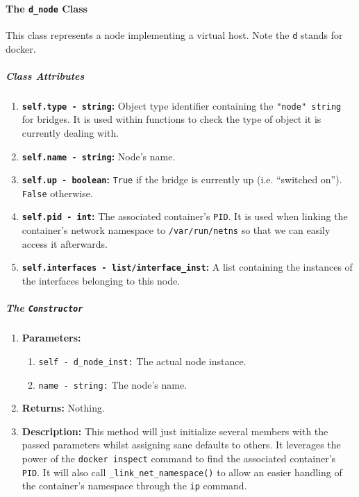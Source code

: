                 \paragraph{The \texttt{d\_node} Class}
                    This class represents a node implementing a virtual host. Note the \texttt{d} stands for docker.

                    \subparagraph{Class Attributes}
                        \begin{enumerate}
                            \item \textbf{\texttt{self.type - string}:} Object type identifier containing the \texttt{"node" string} for bridges. It is used within functions to check the type of object it is currently dealing with.
                            \item \textbf{\texttt{self.name - string}:} Node's name.
                            \item \textbf{\texttt{self.up - boolean}:} \texttt{True} if the bridge is currently up (i.e. ``switched on''). \texttt{False} otherwise.
                            \item \textbf{\texttt{self.pid - int}:} The associated container's \texttt{PID}. It is used when linking the container's network namespace to \texttt{/var/run/netns} so that we can easily access it afterwards.
                            \item \textbf{\texttt{self.interfaces - list/interface\_inst}:}  A list containing the instances of the interfaces belonging to this node.
                        \end{enumerate}

                    \subparagraph{The \texttt{Constructor}}
                        \begin{enumerate}
                            \item \textbf{Parameters:}
                            \begin{enumerate}
                                \item \texttt{self - d\_node\_inst:} The actual node instance.
                                \item \texttt{name - string:} The node's name.
                            \end{enumerate}
                            \item \textbf{Returns:} Nothing.
                            \item \textbf{Description:} This method will just initialize several members with the passed parameters whilst assigning sane defaults to others. It leverages the power of the \texttt{docker inspect} command to find the associated container's \texttt{PID}. It will also call \texttt{\_link\_net\_namespace()} to allow an easier handling of the container's namespace through the \texttt{ip} command.
                        \end{enumerate}

